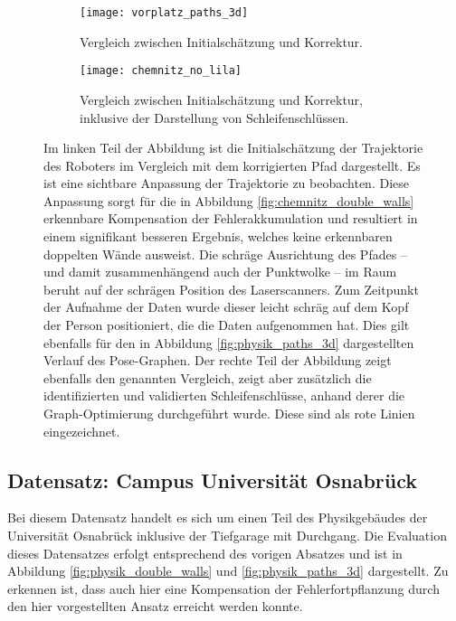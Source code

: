 \begin{figure}
	\centering
	\begin{subfigure}{.65\textwidth}
		 \centering
  		 \texttt{[image: vorplatz\_paths\_3d]}
  		 \centering \caption{Vergleich zwischen Initialschätzung und Korrektur.}
  		 \label{fig:vorplatz_paths_3d1}
	\end{subfigure}%
	\begin{subfigure}{.35\textwidth}
    	\centering
  		\texttt{[image: chemnitz\_no\_lila]}
  		\centering \caption{Vergleich zwischen Initialschätzung und Korrektur, inklusive der Darstellung von Schleifenschlüssen.}
  		\label{fig:chemnitz_no_lila}
	\end{subfigure}
	\caption{Im linken Teil der Abbildung ist die Initialschätzung der Trajektorie des Roboters im Vergleich mit dem korrigierten Pfad dargestellt. Es ist eine sichtbare Anpassung der Trajektorie zu beobachten. Diese Anpassung sorgt für die in Abbildung \ref{fig:chemnitz_double_walls} erkennbare Kompensation der Fehlerakkumulation und resultiert in einem signifikant besseren Ergebnis, welches keine erkennbaren doppelten Wände ausweist. Die schräge Ausrichtung des Pfades -- und damit zusammenhängend auch der Punktwolke -- im Raum beruht auf der schrägen Position des Laserscanners. Zum Zeitpunkt der Aufnahme der Daten wurde dieser leicht schräg auf dem Kopf der Person positioniert, die die Daten aufgenommen hat. Dies gilt ebenfalls für den in Abbildung \ref{fig:physik_paths_3d} dargestellten Verlauf des Pose-Graphen. Der rechte Teil der Abbildung zeigt ebenfalls den genannten Vergleich, zeigt aber zusätzlich die identifizierten und validierten Schleifenschlüsse, anhand derer die Graph-Optimierung durchgeführt wurde. Diese sind als rote Linien eingezeichnet.}
	\label{fig:vorplatz_paths_3d}
\end{figure}


\subsection{Datensatz: Campus Universität Osnabrück}

Bei diesem Datensatz handelt es sich um einen Teil des Physikgebäudes der Universität Osnabrück inklusive der Tiefgarage mit Durchgang. Die Evaluation dieses Datensatzes erfolgt entsprechend des vorigen Absatzes und ist in Abbildung \ref{fig:physik_double_walls} und \ref{fig:physik_paths_3d} dargestellt. Zu erkennen ist, dass auch hier eine Kompensation der Fehlerfortpflanzung durch den hier vorgestellten Ansatz erreicht werden konnte.

